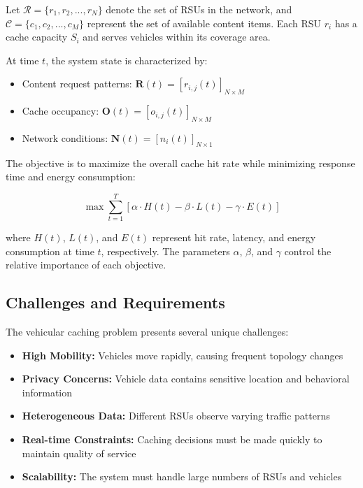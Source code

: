 \documentclass[conference]{IEEEtran}
\begin{document}
Let $\mathcal{R} = \{r_1, r_2, ..., r_N\}$ denote the set of RSUs in the network, and $\mathcal{C} = \{c_1, c_2, ..., c_M\}$ represent the set of available content items. Each RSU $r_i$ has a cache capacity $S_i$ and serves vehicles within its coverage area.

At time $t$, the system state is characterized by:
\begin{itemize}
\item Content request patterns: $\mathbf{R}(t) = [r_{i,j}(t)]_{N \times M}$
\item Cache occupancy: $\mathbf{O}(t) = [o_{i,j}(t)]_{N \times M}$
\item Network conditions: $\mathbf{N}(t) = [n_i(t)]_{N \times 1}$
\end{itemize}

The objective is to maximize the overall cache hit rate while minimizing response time and energy consumption:

\begin{equation}
\max \sum_{t=1}^{T} \left[ \alpha \cdot H(t) - \beta \cdot L(t) - \gamma \cdot E(t) \right]
\end{equation}

where $H(t)$, $L(t)$, and $E(t)$ represent hit rate, latency, and energy consumption at time $t$, respectively. The parameters $\alpha$, $\beta$, and $\gamma$ control the relative importance of each objective.

\subsection{Challenges and Requirements}

The vehicular caching problem presents several unique challenges:

\begin{itemize}
\item \textbf{High Mobility:} Vehicles move rapidly, causing frequent topology changes
\item \textbf{Privacy Concerns:} Vehicle data contains sensitive location and behavioral information
\item \textbf{Heterogeneous Data:} Different RSUs observe varying traffic patterns
\item \textbf{Real-time Constraints:} Caching decisions must be made quickly to maintain quality of service
\item \textbf{Scalability:} The system must handle large numbers of RSUs and vehicles
\end{itemize}
\end{document}
